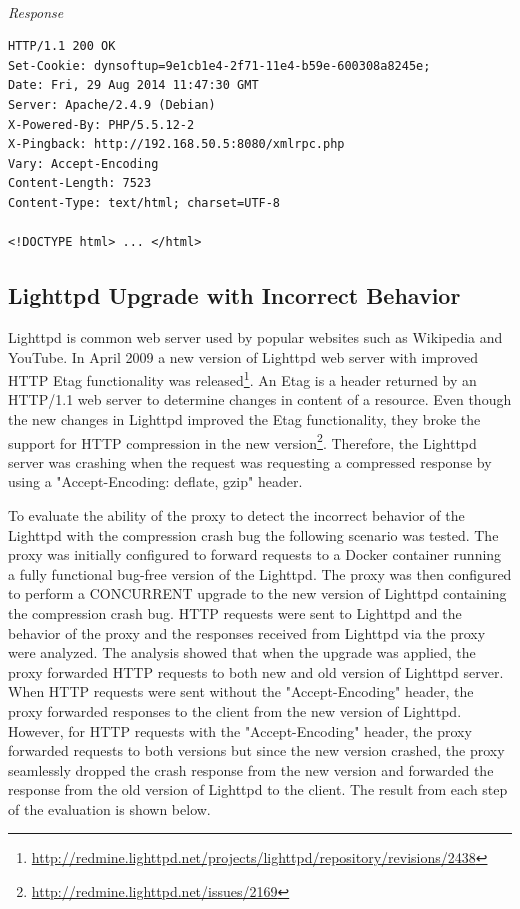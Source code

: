 \documentclass[a4paper,11pt,twoside]{report}
\begin{document}
\noindent\\
\textit{Response}
\begin{lstlisting}[language=terminal] 
HTTP/1.1 200 OK
Set-Cookie: dynsoftup=9e1cb1e4-2f71-11e4-b59e-600308a8245e;
Date: Fri, 29 Aug 2014 11:47:30 GMT
Server: Apache/2.4.9 (Debian)
X-Powered-By: PHP/5.5.12-2
X-Pingback: http://192.168.50.5:8080/xmlrpc.php
Vary: Accept-Encoding
Content-Length: 7523
Content-Type: text/html; charset=UTF-8

<!DOCTYPE html> ... </html>
\end{lstlisting}
 


\subsection{Lighttpd Upgrade with Incorrect Behavior} 
Lighttpd is common web server used by popular websites such as Wikipedia and YouTube. In April 2009 a new version of Lighttpd web server with improved HTTP Etag functionality was released\footnote{\url{http://redmine.lighttpd.net/projects/lighttpd/repository/revisions/2438}}. An Etag is a header returned by an HTTP/1.1 web server to determine changes in content of a resource. Even though the new changes in Lighttpd improved the Etag functionality, they broke the support for HTTP compression in the new version\footnote{\url {http://redmine.lighttpd.net/issues/2169}}. Therefore, the Lighttpd server was crashing when the request was requesting a compressed response by using a "Accept-Encoding: deflate, gzip" header.

To evaluate the ability of the proxy to detect the incorrect behavior of the Lighttpd with the compression crash bug the following scenario was tested. The proxy was initially configured to forward requests to a Docker container running a fully functional bug-free version of the Lighttpd. The proxy was then configured to perform a CONCURRENT upgrade to the new version of Lighttpd containing the compression crash bug. HTTP requests were sent to Lighttpd and the behavior of the proxy and the responses received from Lighttpd via the proxy were analyzed. The analysis showed that when the upgrade was applied, the proxy forwarded HTTP requests to both new and old version of Lighttpd server. When HTTP requests were sent without the "Accept-Encoding" header, the proxy forwarded responses to the client from the new version of Lighttpd. However, for HTTP requests with the "Accept-Encoding" header, the proxy forwarded requests to both versions but since the new version crashed, the proxy seamlessly dropped the crash response from the new version and forwarded the response from the old version of Lighttpd to the client. The result from each step of the evaluation is shown below.
\end{document}
